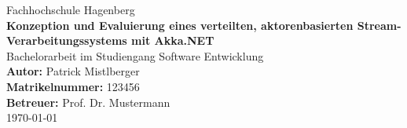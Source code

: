 \documentclass[a4paper,12pt,oneside]{scrreprt} %
\begin{document}
\begin{titlepage}
\centering
{\Large Fachhochschule Hagenberg \\[1cm]}
{\Huge \textbf{Konzeption und Evaluierung eines verteilten, aktorenbasierten Stream-Verarbeitungssystems mit
Akka.NET}}\\[1cm]
{\large Bachelorarbeit im Studiengang Software Entwicklung}\\[2cm]
\textbf{Autor:} Patrick Mistlberger\\
\textbf{Matrikelnummer:} 123456\\[0.5cm]
\textbf{Betreuer:} Prof. Dr. Mustermann\\[2cm]
\today
\end{titlepage}

\tableofcontents
\clearpage









\printbibliography
\end{document}
